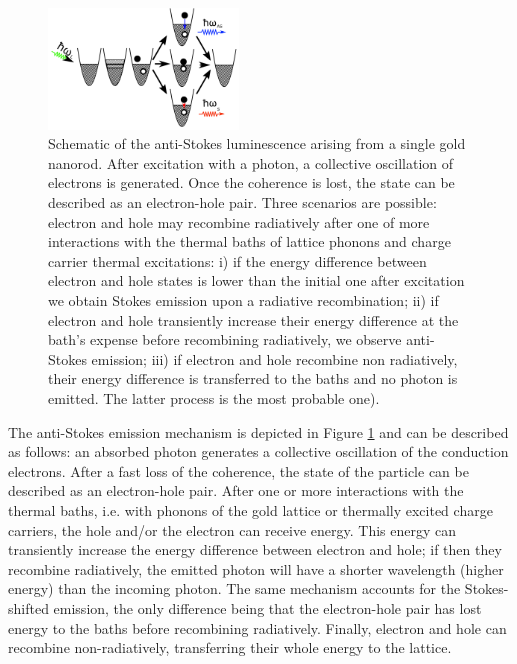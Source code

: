 \documentclass[journal=nalefd,manuscript=letter]{achemso}
\begin{document}
\begin{figure}[htp] \centering
\includegraphics[width=0.45\textwidth]{Figures/02_Scheme/luminescence_all_AS.png}
\caption{Schematic of the anti-Stokes luminescence arising from a single gold
nanorod. After excitation with a photon, a collective oscillation of electrons
is generated. Once the coherence is lost, the state can be described as an
electron-hole pair. Three scenarios are possible: electron and hole may
recombine radiatively after one of more interactions with the thermal baths of
lattice phonons and charge carrier thermal excitations: i) if the energy
difference between electron and hole states is lower than the initial one after
excitation we obtain Stokes emission upon a radiative recombination; ii) if
electron and hole transiently increase their energy difference at the bath's
expense before recombining radiatively, we observe anti-Stokes emission; iii) if
electron and hole recombine non radiatively, their energy difference is
transferred to the baths and no photon is emitted. The latter process is the
most probable one).}
	\label{fig:anti-Stokes-process}
\end{figure}

The anti-Stokes emission mechanism\cite{He2015} is depicted in Figure
\ref{fig:anti-Stokes-process} and can be described as follows: an absorbed
photon generates a collective oscillation of the conduction electrons. After a
fast loss of the coherence\cite{Sonnichsen2002}, the state of the particle can
be described as an electron-hole pair. After one or more interactions with the thermal
baths, i.e. with phonons of the gold lattice\cite{Lin2008} or thermally
excited charge carriers\cite{Sun1994}, the hole and/or the electron can
receive energy. This energy can transiently increase the energy difference between electron and
hole; if then they recombine radiatively, the emitted photon will have a shorter
wavelength (higher energy) than the incoming photon\cite{Huang2014}. The same
mechanism accounts for the Stokes-shifted emission, the only difference being
that the electron-hole pair has lost energy to the baths before recombining
radiatively. Finally, electron and hole can recombine
non-radiatively, transferring their whole energy to the lattice. 
\end{document}
